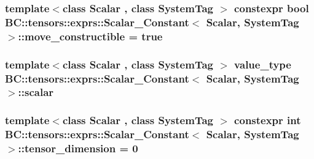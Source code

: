 \subsubsection[{\texorpdfstring{move\+\_\+constructible}{move_constructible}}]{\setlength{\rightskip}{0pt plus 5cm}template$<$class Scalar , class System\+Tag $>$ constexpr bool {\bf B\+C\+::tensors\+::exprs\+::\+Scalar\+\_\+\+Constant}$<$ {\bf Scalar}, System\+Tag $>$\+::move\+\_\+constructible = true\hspace{0.3cm}{\ttfamily [static]}}\hypertarget{structBC_1_1tensors_1_1exprs_1_1Scalar__Constant_a5c71bda5c16da054ea0f8a9e50d325a2}{}\label{structBC_1_1tensors_1_1exprs_1_1Scalar__Constant_a5c71bda5c16da054ea0f8a9e50d325a2}
\subsubsection[{\texorpdfstring{scalar}{scalar}}]{\setlength{\rightskip}{0pt plus 5cm}template$<$class Scalar , class System\+Tag $>$ {\bf value\+\_\+type} {\bf B\+C\+::tensors\+::exprs\+::\+Scalar\+\_\+\+Constant}$<$ {\bf Scalar}, System\+Tag $>$\+::scalar}\hypertarget{structBC_1_1tensors_1_1exprs_1_1Scalar__Constant_a803d034d27533cb7c99dbba7d44b8215}{}\label{structBC_1_1tensors_1_1exprs_1_1Scalar__Constant_a803d034d27533cb7c99dbba7d44b8215}
\subsubsection[{\texorpdfstring{tensor\+\_\+dimension}{tensor_dimension}}]{\setlength{\rightskip}{0pt plus 5cm}template$<$class Scalar , class System\+Tag $>$ constexpr int {\bf B\+C\+::tensors\+::exprs\+::\+Scalar\+\_\+\+Constant}$<$ {\bf Scalar}, System\+Tag $>$\+::tensor\+\_\+dimension = 0\hspace{0.3cm}{\ttfamily [static]}}\hypertarget{structBC_1_1tensors_1_1exprs_1_1Scalar__Constant_a5a81f96b76d0729fc2b5a114bea3de4b}{}\label{structBC_1_1tensors_1_1exprs_1_1Scalar__Constant_a5a81f96b76d0729fc2b5a114bea3de4b}
